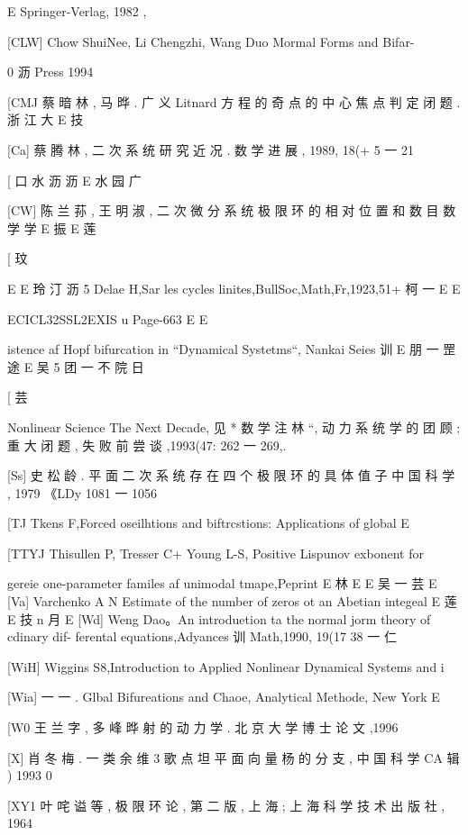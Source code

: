 E
Springer-Verlag, 1982 ,

[CLW] Chow ShuiNee, Li Chengzhi, Wang Duo Mormal Forms and Bifar-

0 沥
Press 1994

[CMJ 蔡 暗 林 , 马 晔 . 广 义 Litnard 方 程 的 奇 点 的 中 心 焦 点 判 定 闭 题 . 浙 江 大
E 技

[Ca] 蔡 腾 林 , 二 次 系 统 研 究 近 况 . 数 学 进 展 , 1989, 18(+ 5 一 21

[ 口 水 沥 沥
E 水 园 广

[CW] 陈 兰 荪 , 王 明 淑 , 二 次 微 分 系 统 极 限 环 的 相 对 位 置 和 数 目 数 学 学
E 振 E 莲

[
玟

E
E 玲 汀 沥 5
Delae H,Sar les cycles linites,BullSoc,Math,Fr,1923,51+ 柯 一
E
E

ECICL32SSL2EXIS u
Page-663
E E

istence af Hopf bifurcation in “Dynamical Systetms“, Nankai Seies 训
E 朋 一 罡 途
E 吴 5 团 一 不 院 日

[ 芸

Nonlinear Science The Next Decade, 见 * 数 学 注 林 “, 动 力 系 统 学 的 团
顾 ; 重 大 闭 题 , 失 败 前 尝 谈 ,1993(47: 262 一 269,.

[Ss] 史 松 龄 . 平 面 二 次 系 统 存 在 四 个 极 限 环 的 具 体 值 子 中 国 科 学 , 1979
《LDy 1081 一 1056

[TJ Tkens F,Forced oseilhtions and biftrcstions: Applications of global
E

[TTYJ Thisullen P, Tresser C+ Young L-S, Positive Lispunov exbonent for

gereie one-parameter familes af unimodal tmape,Peprint
E 林 E
E 吴 一 芸
E
[Va] Varchenko A N Estimate of the number of zeros ot an Abetian integeal
E 莲
E 技 n
月
E
[Wd] Weng Dao。An introduetion ta the normal jorm theory of cdinary dif-
ferental equations,Adyances 训 Math,1990, 19(17 38 一 仁

[WiH] Wiggins S8,Introduction to Applied Nonlinear Dynamical Systems and
i

[Wia] 一 一 . Glbal Bifureations and Chaoe, Analytical Methode, New York
E

[W0 王 兰 字 , 多 峰 晔 射 的 动 力 学 . 北 京 大 学 博 士 论 文 ,1996

[X] 肖 冬 梅 . 一 类 余 维 3 歌 点 坦 平 面 向 量 杨 的 分 支 , 中 国 科 学 CA 辑 ) 1993
0

[XY1 叶 咤 谥 等 , 极 限 环 论 , 第 二 版 , 上 海 ; 上 海 科 学 技 术 出 版 社 , 1964

